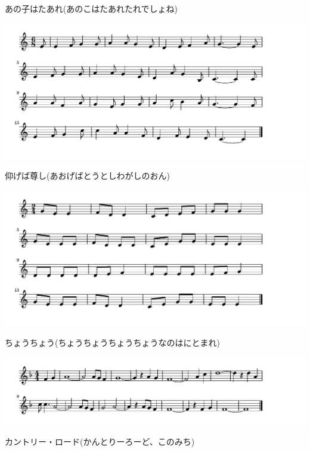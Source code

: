 \documentclass[a4paper]{ltjsarticle}
\begin{document}
\vspace{-10mm} \hspace{10mm}
あの子はたあれ(あのこはたあれたれでしょね)

\includegraphics[clip]{aogeba_crop.pdf}

\vspace{-10mm} \hspace{10mm}
仰げば尊し(あおげばとうとしわがしのおん)

\includegraphics[clip]{chouchou_crop.pdf}

\vspace{-10mm} \hspace{10mm}
ちょうちょう(ちょうちょうちょうちょうなのはにとまれ)

\includegraphics[clip]{countryroad_crop.pdf}

\vspace{-10mm} \hspace{10mm}
カントリー・ロード(かんとりーろーど、このみち)
\end{document}
